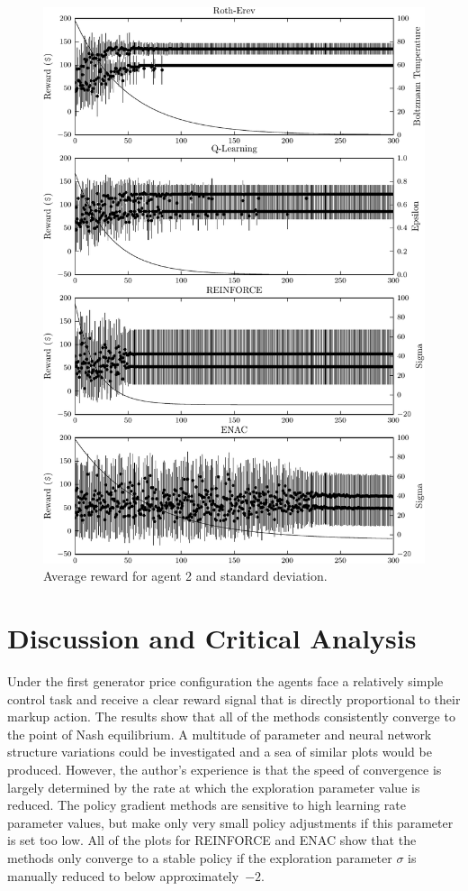 {\begin{figure}
	  \includegraphics{figures/fig5_2_reward_a2}
	  \caption{Average reward for agent 2 and standard deviation.}
	  \label{fig:5_2_reward_a2}
	\end{figure}
}{}

\section{Discussion and Critical Analysis}
Under the first generator price configuration the agents face a
relatively simple control task and receive a clear reward signal that is
directly proportional to their markup action.  The results show that all of
the methods consistently converge to the point of Nash equilibrium.  A
multitude of parameter and neural network structure variations could be
investigated and a sea of similar plots would be produced.  However, the
author's experience is that the speed of convergence is largely determined by
the rate at which the exploration parameter value is reduced. The policy
gradient methods are sensitive to high learning rate parameter values, but
make only very small policy adjustments if this parameter is set too low. All
of the plots for REINFORCE and ENAC show that the methods only converge to a
stable policy if the exploration parameter $\sigma$ is manually reduced to
below approximately~$-2$.

